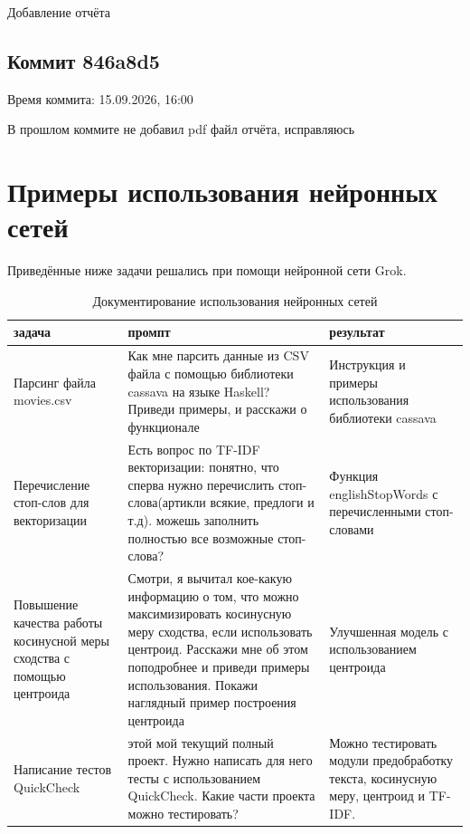 \documentclass[a4paper, 16pt]{article}
\begin{document}
Добавление отчёта

\subsection*{Коммит 846a8d5}
Время коммита: 15.09.2026, 16:00

В прошлом коммите не добавил pdf файл отчёта, исправляюсь

\section{Примеры использования нейронных сетей}

Приведённые ниже задачи решались при помощи нейронной сети Grok.

\begin{table}[H]
    \centering
    \begin{tabular}{|p{5cm}|p{6cm}|p{6cm}|}
    \hline
    задача & промпт & результат \\
    \hline
    Парсинг файла movies.csv & Как мне парсить данные из CSV файла с помощью библиотеки cassava на языке Haskell? Приведи примеры, и расскажи о функционале & Инструкция и примеры использования библиотеки cassava\\
    \hline 
    Перечисление стоп-слов для векторизации & Есть вопрос по TF-IDF векторизации: понятно, что сперва нужно перечислить стоп-слова(артикли всякие, предлоги и т.д). можешь заполнить полностью все возможные стоп-слова? & Функция englishStopWords с перечисленными стоп-словами\\
    \hline
    Повышение качества работы косинусной меры сходства с помощью центроида & Смотри, я вычитал кое-какую информацию о том, что можно максимизировать косинусную меру сходства, если использовать центроид. Расскажи мне об этом поподробнее и приведи примеры использования. Покажи наглядный пример построения центроида & Улучшенная модель с использованием центроида\\
    \hline
    Написание тестов QuickCheck & этой мой текущий полный проект. Нужно написать для него тесты с использованием QuickCheck. Какие части проекта можно тестировать? & Можно тестировать модули предобработку текста, косинусную меру, центроид и TF-IDF.\\
    \hline
    \end{tabular}
    \caption{Документирование использования нейронных сетей}
    \label{tab:placeholder}
\end{table}
\end{document}
